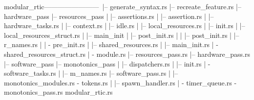 modular_rtic------------------------\
|-- generate_syntax.rs              |-- recreate_feature.rs
|-- hardware_pass                   |-- resources_pass
|   |-- assertions.rs               |   |-- assertion.rs
|   |-- hardware_tasks.rs           |   |-- context.rs
|   |-- idle.rs                     |   |-- local_resources.rs
|   |-- init.rs                     |   |-- local_resources_struct.rs
|   |-- main_init                   |   |-- post_init.rs
|   |   |-- post_init.rs            |   |-- r_names.rs
|   |   \-- pre_init.rs             |   |-- shared_resources.rs
|   |-- main_init.rs                |   \-- shared_resources_struct.rs
|   \-- module.rs                   |-- resources_pass.rs
|-- hardware_pass.rs                |-- software_pass
|-- monotonics_pass                 |   |-- dispatchers.rs
|   |-- init.rs                     |   \-- software_tasks.rs
|   |-- m_names.rs                  |-- software_pass.rs
|   |-- monotonics_modules.rs       \-- tokens.rs
|   |-- spawn_handler.rs
|   \-- timer_queue.rs
\-- monotonics_pass.rs
modular_rtic.rs